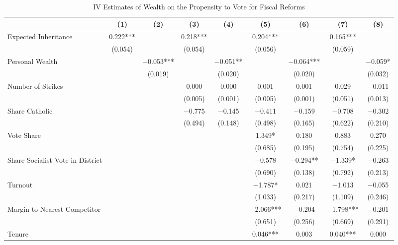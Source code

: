 \begin{table}

\caption{\label{tab:iv_results_inheritance}IV Estimates of Wealth on the Propensity to Vote for Fiscal Reforms}
\centering
\begin{tabular}[t]{lcccccccc}
\toprule
  & (1) & (2) & (3) & (4) & (5) & (6) & (7) & (8)\\
\midrule
Expected Inheritance & \num{0.222}*** &  & \num{0.218}*** &  & \num{0.204}*** &  & \num{0.165}*** & \\
 & (\num{0.054}) &  & (\num{0.054}) &  & (\num{0.056}) &  & (\num{0.059}) & \\
Personal Wealth &  & \num{-0.053}*** &  & \num{-0.051}** &  & \num{-0.064}*** &  & \num{-0.059}*\\
 &  & (\num{0.019}) &  & (\num{0.020}) &  & (\num{0.020}) &  & (\num{0.032})\\
Number of Strikes &  &  & \num{0.000} & \num{0.000} & \num{0.001} & \num{0.001} & \num{0.029} & \num{-0.011}\\
 &  &  & (\num{0.005}) & (\num{0.001}) & (\num{0.005}) & (\num{0.001}) & (\num{0.051}) & (\num{0.013})\\
Share Catholic &  &  & \num{-0.775} & \num{-0.145} & \num{-0.411} & \num{-0.159} & \num{-0.708} & \num{-0.302}\\
 &  &  & (\num{0.494}) & (\num{0.148}) & (\num{0.498}) & (\num{0.165}) & (\num{0.622}) & (\num{0.210})\\
Vote Share &  &  &  &  & \num{1.349}* & \num{0.180} & \num{0.883} & \num{0.270}\\
 &  &  &  &  & (\num{0.685}) & (\num{0.195}) & (\num{0.754}) & (\num{0.225})\\
Share Socialist Vote in District &  &  &  &  & \num{-0.578} & \num{-0.294}** & \num{-1.339}* & \num{-0.263}\\
 &  &  &  &  & (\num{0.690}) & (\num{0.138}) & (\num{0.792}) & (\num{0.213})\\
Turnout &  &  &  &  & \num{-1.787}* & \num{0.021} & \num{-1.013} & \num{-0.055}\\
 &  &  &  &  & (\num{1.033}) & (\num{0.217}) & (\num{1.109}) & (\num{0.246})\\
Margin to Nearest Competitor &  &  &  &  & \num{-2.066}*** & \num{-0.204} & \num{-1.798}*** & \num{-0.201}\\
 &  &  &  &  & (\num{0.651}) & (\num{0.256}) & (\num{0.669}) & (\num{0.291})\\
Tenure &  &  &  &  & \num{0.046}*** & \num{0.003} & \num{0.040}*** & \num{0.000}\\

\end{tabular}
\end{table}
